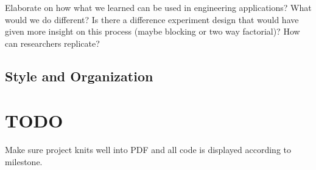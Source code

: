 \documentclass[
]{article}
\begin{document}
Elaborate on how what we learned can be used in engineering
applications? What would we do different? Is there a difference
experiment design that would have given more insight on this process
(maybe blocking or two way factorial)? How can researchers replicate?

\hypertarget{style-and-organization}{%
\subsection{Style and Organization}\label{style-and-organization}}

\hypertarget{todo-3}{%
\section{TODO}\label{todo-3}}

Make sure project knits well into PDF and all code is displayed
according to milestone.
\end{document}

